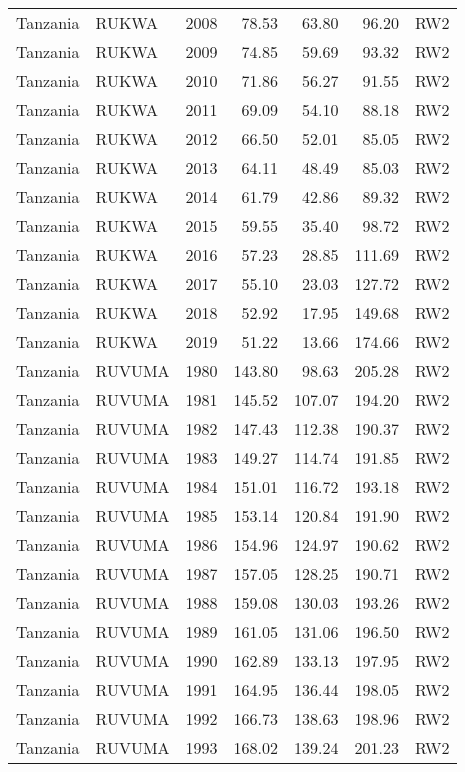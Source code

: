 \begin{longtable}{lllrrrl}
  Tanzania & RUKWA & 2008 & 78.53 & 63.80 & 96.20 & RW2 \\ 
  Tanzania & RUKWA & 2009 & 74.85 & 59.69 & 93.32 & RW2 \\ 
  Tanzania & RUKWA & 2010 & 71.86 & 56.27 & 91.55 & RW2 \\ 
  Tanzania & RUKWA & 2011 & 69.09 & 54.10 & 88.18 & RW2 \\ 
  Tanzania & RUKWA & 2012 & 66.50 & 52.01 & 85.05 & RW2 \\ 
  Tanzania & RUKWA & 2013 & 64.11 & 48.49 & 85.03 & RW2 \\ 
  Tanzania & RUKWA & 2014 & 61.79 & 42.86 & 89.32 & RW2 \\ 
  Tanzania & RUKWA & 2015 & 59.55 & 35.40 & 98.72 & RW2 \\ 
  Tanzania & RUKWA & 2016 & 57.23 & 28.85 & 111.69 & RW2 \\ 
  Tanzania & RUKWA & 2017 & 55.10 & 23.03 & 127.72 & RW2 \\ 
  Tanzania & RUKWA & 2018 & 52.92 & 17.95 & 149.68 & RW2 \\ 
  Tanzania & RUKWA & 2019 & 51.22 & 13.66 & 174.66 & RW2 \\ 
  Tanzania & RUVUMA & 1980 & 143.80 & 98.63 & 205.28 & RW2 \\ 
  Tanzania & RUVUMA & 1981 & 145.52 & 107.07 & 194.20 & RW2 \\ 
  Tanzania & RUVUMA & 1982 & 147.43 & 112.38 & 190.37 & RW2 \\ 
  Tanzania & RUVUMA & 1983 & 149.27 & 114.74 & 191.85 & RW2 \\ 
  Tanzania & RUVUMA & 1984 & 151.01 & 116.72 & 193.18 & RW2 \\ 
  Tanzania & RUVUMA & 1985 & 153.14 & 120.84 & 191.90 & RW2 \\ 
  Tanzania & RUVUMA & 1986 & 154.96 & 124.97 & 190.62 & RW2 \\ 
  Tanzania & RUVUMA & 1987 & 157.05 & 128.25 & 190.71 & RW2 \\ 
  Tanzania & RUVUMA & 1988 & 159.08 & 130.03 & 193.26 & RW2 \\ 
  Tanzania & RUVUMA & 1989 & 161.05 & 131.06 & 196.50 & RW2 \\ 
  Tanzania & RUVUMA & 1990 & 162.89 & 133.13 & 197.95 & RW2 \\ 
  Tanzania & RUVUMA & 1991 & 164.95 & 136.44 & 198.05 & RW2 \\ 
  Tanzania & RUVUMA & 1992 & 166.73 & 138.63 & 198.96 & RW2 \\ 
  Tanzania & RUVUMA & 1993 & 168.02 & 139.24 & 201.23 & RW2 \\ 

\end{longtable}
